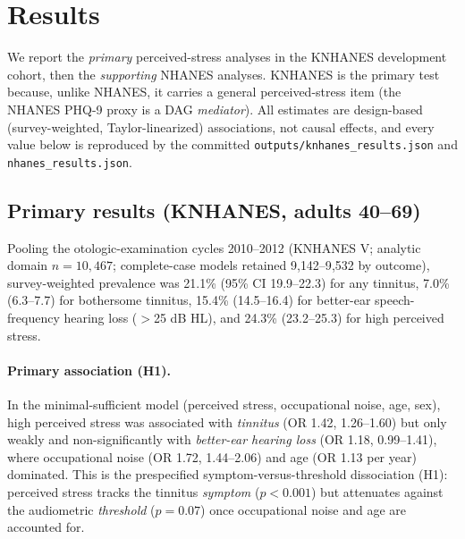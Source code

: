 \section{Results}\label{sec:results}
We report the \emph{primary} perceived-stress analyses in the KNHANES development
cohort, then the \emph{supporting} NHANES analyses. KNHANES is the primary test
because, unlike NHANES, it carries a general perceived-stress item (the NHANES
PHQ-9 proxy is a DAG \emph{mediator}). All estimates are design-based
(survey-weighted, Taylor-linearized) associations, not causal effects, and every
value below is reproduced by the committed \texttt{outputs/knhanes\_results.json}
and \texttt{nhanes\_results.json}.

\subsection{Primary results (KNHANES, adults 40--69)}
Pooling the otologic-examination cycles 2010--2012 (KNHANES V; analytic domain
$n=10{,}467$; complete-case models retained 9{,}142--9{,}532 by outcome),
survey-weighted prevalence was 21.1\% (95\% CI 19.9--22.3) for any tinnitus, 7.0\%
(6.3--7.7) for bothersome tinnitus, 15.4\% (14.5--16.4) for better-ear
speech-frequency hearing loss ($>$25 dB HL), and 24.3\% (23.2--25.3) for high
perceived stress.

\paragraph{Primary association (H1).} In the minimal-sufficient model (perceived
stress, occupational noise, age, sex), high perceived stress was associated with
\emph{tinnitus} (OR 1.42, 1.26--1.60) but only weakly and non-significantly with
\emph{better-ear hearing loss} (OR 1.18, 0.99--1.41), where occupational noise (OR
1.72, 1.44--2.06) and age (OR 1.13 per year) dominated. This is the prespecified
symptom-versus-threshold dissociation (H1): perceived stress tracks the tinnitus
\emph{symptom} ($p<0.001$) but attenuates against the audiometric \emph{threshold}
($p=0.07$) once occupational noise and age are accounted for.

